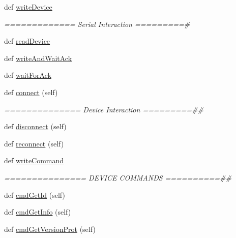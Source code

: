 \begin{DoxyCompactItemize}
\item 
def \hyperlink{classstm__tools_1_1serialflasher_1_1serialtool_1_1SerialTool_ac4991de66e562d2ab02e7eff4fcc0305}{write\+Device}
\begin{DoxyCompactList}\small\item\em ============= Serial Interaction =========\# \end{DoxyCompactList}\item 
def \hyperlink{classstm__tools_1_1serialflasher_1_1serialtool_1_1SerialTool_a29d870b59f3b5d88667f0f34af750ccf}{read\+Device}
\item 
def \hyperlink{classstm__tools_1_1serialflasher_1_1serialtool_1_1SerialTool_a06853b692f8bc33fdffaf70c0862529a}{write\+And\+Wait\+Ack}
\item 
def \hyperlink{classstm__tools_1_1serialflasher_1_1serialtool_1_1SerialTool_a6ec64a368f74e6bc01797a90c9a4802f}{wait\+For\+Ack}
\item 
def \hyperlink{classstm__tools_1_1serialflasher_1_1serialtool_1_1SerialTool_a5505259a51131fe89dbde6fbeab32b52}{connect} (self)
\begin{DoxyCompactList}\small\item\em ============== Device Interaction =========\#\# \end{DoxyCompactList}\item 
def \hyperlink{classstm__tools_1_1serialflasher_1_1serialtool_1_1SerialTool_afe00fd94add5c82aa6cab53e81ef3489}{disconnect} (self)
\item 
def \hyperlink{classstm__tools_1_1serialflasher_1_1serialtool_1_1SerialTool_a480a5cff9b431bb6ef8fc84d363e3a58}{reconnect} (self)
\item 
def \hyperlink{classstm__tools_1_1serialflasher_1_1serialtool_1_1SerialTool_a2c26a88db6bb3b4270b43ab908fa7e7f}{write\+Command}
\begin{DoxyCompactList}\small\item\em =============== D\+E\+V\+I\+CE C\+O\+M\+M\+A\+N\+DS ==========\#\# \end{DoxyCompactList}\item 
def \hyperlink{classstm__tools_1_1serialflasher_1_1serialtool_1_1SerialTool_a24c2b769f8721fbdbf37b005c30d3866}{cmd\+Get\+Id} (self)
\item 
def \hyperlink{classstm__tools_1_1serialflasher_1_1serialtool_1_1SerialTool_a248aa53e6c2299c84dedd466816c08b5}{cmd\+Get\+Info} (self)
\item 
def \hyperlink{classstm__tools_1_1serialflasher_1_1serialtool_1_1SerialTool_a232f400cabb6f4d95701e1466e0aa056}{cmd\+Get\+Version\+Prot} (self)

\end{DoxyCompactItemize}
